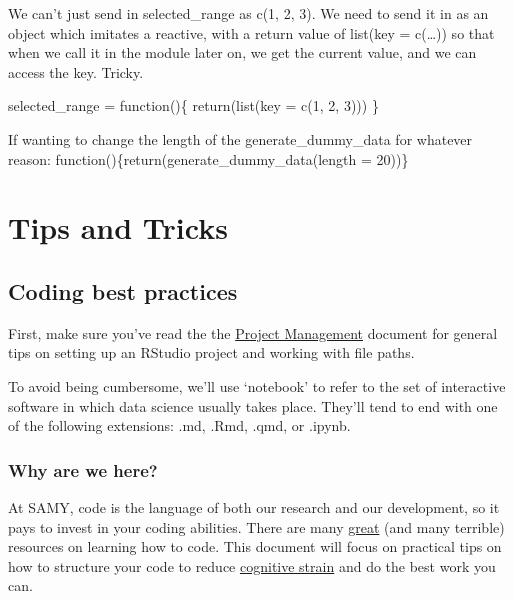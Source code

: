 \documentclass[
  letterpaper,
  DIV=11,
  numbers=noendperiod]{scrreprt}
\begin{document}
We can't just send in selected\_range as c(1, 2, 3). We need to send it
in as an object which imitates a reactive, with a return value of
list(key = c(\ldots)) so that when we call it in the module later on, we
get the current value, and we can access the key. Tricky.

selected\_range = function()\{ return(list(key = c(1, 2, 3))) \}

If wanting to change the length of the generate\_dummy\_data for
whatever reason: function()\{return(generate\_dummy\_data(length =
20))\}

\part{Tips and Tricks}

\chapter{Coding best practices}\label{coding-best-practices}

First, make sure you've read the the
\href{project_management.qmd}{Project Management} document for general
tips on setting up an RStudio project and working with file paths.

\begin{tcolorbox}[enhanced jigsaw, colback=white, opacitybacktitle=0.6, coltitle=black, left=2mm, breakable, bottomtitle=1mm, toptitle=1mm, toprule=.15mm, colframe=quarto-callout-note-color-frame, titlerule=0mm, title=\textcolor{quarto-callout-note-color}{\faInfo}\hspace{0.5em}{Note}, colbacktitle=quarto-callout-note-color!10!white, rightrule=.15mm, bottomrule=.15mm, arc=.35mm, opacityback=0, leftrule=.75mm]

To avoid being cumbersome, we'll use `notebook' to refer to the set of
interactive software in which data science usually takes place. They'll
tend to end with one of the following extensions: .md, .Rmd, .qmd, or
.ipynb.

\end{tcolorbox}

\section{Why are we here?}\label{why-are-we-here}

At SAMY, code is the language of both our research and our development,
so it pays to invest in your coding abilities. There are many
\hyperref[great-coding-resources]{great} (and many terrible) resources
on learning how to code. This document will focus on practical tips on
how to structure your code to reduce
\href{https://link.springer.com/article/10.1007/s10648-019-09465-5}{cognitive
strain} and do the best work you can.
\end{document}
